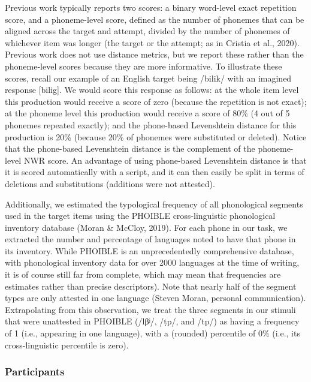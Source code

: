 \documentclass[english,,man,floatsintext]{apa6}
\begin{document}
Previous work typically reports two scores: a binary word-level exact repetition score, and a phoneme-level score, defined as the number of phonemes that can be aligned across the target and attempt, divided by the number of phonemes of whichever item was longer (the target or the attempt; as in Cristia et al., 2020). Previous work does not use distance metrics, but we report these rather than the phoneme-level scores because they are more informative. To illustrate these scores, recall our example of an English target being /bilik/ with an imagined response {[}bilig{]}. We would score this response as follows: at the whole item level this production would receive a score of zero (because the repetition is not exact); at the phoneme level this production would receive a score of 80\% (4 out of 5 phonemes repeated exactly); and the phone-based Levenshtein distance for this production is 20\% (because 20\% of phonemes were substituted or deleted). Notice that the phone-based Levenshtein distance is the complement of the phoneme-level NWR score. An advantage of using phone-based Levenshtein distance is that it is scored automatically with a script, and it can then easily be split in terms of deletions and substitutions (additions were not attested).

Additionally, we estimated the typological frequency of all phonological segments used in the target items using the PHOIBLE cross-linguistic phonological inventory database (Moran \& McCloy, 2019). For each phone in our task, we extracted the number and percentage of languages noted to have that phone in its inventory. While PHOIBLE is an unprecedentedly comprehensive database, with phonological inventory data for over 2000 languages at the time of writing, it is of course still far from complete, which may mean that frequencies are estimates rather than precise descriptors). Note that nearly half of the segment types are only attested in one language (Steven Moran, personal communication). Extrapolating from this observation, we treat the three segments in our stimuli that were unattested in PHOIBLE (/lβʲ/, /ṭp/, and /tp/) as having a frequency of 1 (i.e., appearing in one language), with a (rounded) percentile of 0\% (i.e., its cross-linguistic percentile is zero).

\hypertarget{participants}{%
\subsubsection{Participants}\label{participants}}
\end{document}
